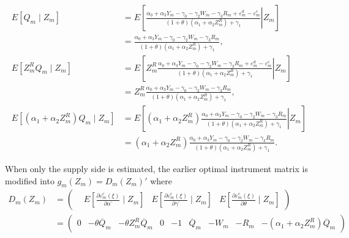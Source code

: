 \documentclass[11pt, a4paper]{article}
\begin{document}
\begin{align*}
    E[Q_{m}\mid Z_{m}] &=E\left[\left.\frac{\alpha_0 + \alpha_3 Y_m - \gamma_0 - \gamma_2 W_{m} - \gamma_3 R_{m} + \varepsilon^{d}_{m} - \varepsilon^{c}_{m}}{(1 + \theta) (\alpha_1 + \alpha_2 Z^{R}_{m}) + \gamma_1}\right| Z_{m}\right] \\
    & = \frac{\alpha_0 + \alpha_3 Y_m - \gamma_0 - \gamma_2 W_{m} - \gamma_3 R_{m}}{(1 + \theta) (\alpha_1 + \alpha_2 Z^{R}_{m}) + \gamma_1},\\
    E[Z^{R}_{m}Q_{m}\mid Z_{m}] &=E\left[\left. Z^{R}_{m}\frac{\alpha_0 + \alpha_3 Y_m - \gamma_0 - \gamma_2 W_{m} - \gamma_3 R_{m} + \varepsilon^{d}_{m} - \varepsilon^{c}_{m}}{(1 + \theta) (\alpha_1 + \alpha_2 Z^{R}_{m}) + \gamma_1}\right | Z_{m}\right]\\
    & = Z^{R}_{m}\frac{\alpha_0 + \alpha_3 Y_m - \gamma_0 - \gamma_2 W_{m} - \gamma_3 R_{m}}{(1 + \theta) (\alpha_1 + \alpha_2 Z^{R}_{m}) + \gamma_1},\\
    E[(\alpha_1 + \alpha_2 Z^{R}_m)Q_{m}\mid Z_{m}] &=E\left[\left. (\alpha_1 + \alpha_2 Z^{R}_m)\frac{\alpha_0 + \alpha_3 Y_m - \gamma_0 - \gamma_2 W_{m} - \gamma_3 R_{m}}{(1 + \theta) (\alpha_1 + \alpha_2 Z^{R}_{m}) + \gamma_1}\right | Z_{m}\right]\\
    &= (\alpha_1 + \alpha_2 Z^{R}_m)\frac{\alpha_0 + \alpha_3 Y_m - \gamma_0 - \gamma_2 W_{m} - \gamma_3 R_{m}}{(1 + \theta) (\alpha_1 + \alpha_2 Z^{R}_{m}) + \gamma_1}.
\end{align*}

When only the supply side is estimated, the earlier optimal instrument matrix is modified into $g_{m}(Z_{m})=D_{m}(Z_{m})'$ where 
\begin{align*}
    D_{m}(Z_{m}) &= \begin{pmatrix}
    & E\left[\frac{\partial \varepsilon_{m}^{c}(\xi)}{\partial \alpha^{\prime}} \mid Z_{m}\right] & 
    E\left[\frac{\partial \varepsilon_{m}^{c}(\xi)}{\partial \gamma^{\prime}} \mid Z_{m}\right] & 
    E\left[\frac{\partial \varepsilon_{m}^{c}(\xi)}{\partial \theta} \mid Z_{m}\right]
    \end{pmatrix} \\
    &=\begin{pmatrix}
    0 &- \theta \overline{Q}_{m} & -\theta Z^{R}_{m}\overline{Q}_{m} & 0 & 
    -1 &
    \overline{Q}_{m} &
    -W_{m} &
    -R_{m} &
    -(\alpha_1 + \alpha_2 Z^{R}_m)\overline{Q}_{m}
    \end{pmatrix}
\end{align*}
\end{document}
